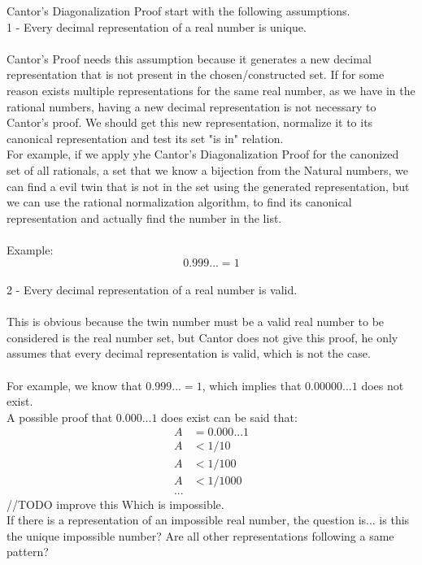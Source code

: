 \documentclass[10pt,a4paper]{article}
\author{Daniel Frederico Lins Leite}
\begin{document}
	Cantor's Diagonalization Proof start with the following assumptions.\\
	1 - Every decimal representation of a real number is unique.\\
	\\
	Cantor's Proof needs this assumption because it generates a new decimal representation that is not present in the chosen/constructed set. If for some reason exists multiple representations for the same real number, as we have in the rational numbers, having a new decimal representation is not necessary to Cantor's proof. We should get this new representation, normalize it to its canonical representation and test its set "is in" relation.\\
	For example, if we apply yhe Cantor's Diagonalization Proof for the canonized set of all rationals, a set that we know a bijection from the Natural numbers, we can find a evil twin that is not in the set using the generated representation, but we can use the rational normalization algorithm, to find its canonical representation and actually find the number in the list.	\\
	\\
	Example:\\
	$$0.999... = 1$$
	\\
	2 - Every decimal representation of a real number is valid.\\
	\\
	This is obvious because the twin number must be a valid real number to be considered is the real number set, but Cantor does not give this proof, he only assumes that every decimal representation is valid, which is not the case.\\
	\\
	For example, we know that $0.999... = 1$, which implies that $0.00000...1$ does not exist.\\
	A possible proof that $0.000...1$ does exist can be said that:\\
	\begin{align*}
		A &= 0.000...1\\
		A &< 1/10\\
		A &< 1/100\\
		A &< 1/1000\\		
		...
	\end{align*}
	//TODO improve this
	Which is impossible.\\
	If there is a representation of an impossible real number, the question is... is this the unique impossible number? Are all other representations following a same pattern?\\
\end{document}
